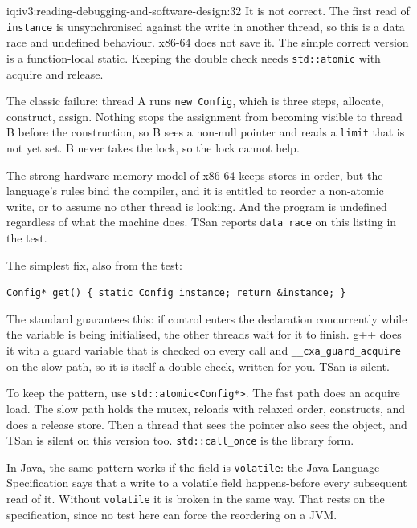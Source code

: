 \begin{solution}{iq:iv3:reading-debugging-and-software-design:32}
It is not correct. The first read of \texttt{instance} is unsynchronised against the write in another thread, so this is a data race and undefined behaviour. x86-64 does not save it. The simple correct version is a function-local static. Keeping the double check needs \texttt{std::atomic} with acquire and release.

The classic failure: thread A runs \texttt{new Config}, which is three steps, allocate, construct, assign. Nothing stops the assignment from becoming visible to thread B before the construction, so B sees a non-null pointer and reads a \texttt{limit} that is not yet set. B never takes the lock, so the lock cannot help.

The strong hardware memory model of x86-64 keeps stores in order, but the language's rules bind the compiler, and it is entitled to reorder a non-atomic write, or to assume no other thread is looking. And the program is undefined regardless of what the machine does. TSan reports \texttt{data race} on this listing in the test.

The simplest fix, also from the test:

\texttt{Config* get() \{ static Config instance; return \&instance; \}}

The standard guarantees this: if control enters the declaration concurrently while the variable is being initialised, the other threads wait for it to finish. g++ does it with a guard variable that is checked on every call and \texttt{\_\_cxa\_guard\_acquire} on the slow path, so it is itself a double check, written for you. TSan is silent.

To keep the pattern, use \texttt{std::atomic<Config*>}. The fast path does an acquire load. The slow path holds the mutex, reloads with relaxed order, constructs, and does a release store. Then a thread that sees the pointer also sees the object, and TSan is silent on this version too. \texttt{std::call\_once} is the library form.

In Java, the same pattern works if the field is \texttt{volatile}: the Java Language Specification says that a write to a volatile field happens-before every subsequent read of it. Without \texttt{volatile} it is broken in the same way. That rests on the specification, since no test here can force the reordering on a JVM.


\end{solution}

